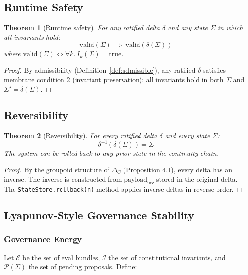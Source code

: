 \documentclass[11pt]{article}
\newtheorem{theorem}{Theorem}[section]
\begin{document}
\subsection{Runtime Safety}

\begin{theorem}[Runtime safety]
\label{thm:safety}
For any ratified delta $\delta$ and any state $\Sigma$ in which
all invariants hold:
\[
  \mathrm{valid}(\Sigma) \;\Longrightarrow\; \mathrm{valid}(\delta(\Sigma))
\]
where $\mathrm{valid}(\Sigma) \Leftrightarrow \forall k.\; I_k(\Sigma) = \mathrm{true}$.
\end{theorem}

\begin{proof}
By admissibility (Definition~\ref{def:admissible}), any ratified
$\delta$ satisfies membrane condition 2 (invariant preservation):
all invariants hold in both $\Sigma$ and $\Sigma' = \delta(\Sigma)$.
\end{proof}

\subsection{Reversibility}

\begin{theorem}[Reversibility]
\label{thm:reversibility}
For every ratified delta $\delta$ and every state $\Sigma$:
\[
  \delta^{-1}(\delta(\Sigma)) = \Sigma
\]
The system can be rolled back to any prior state in the
continuity chain.
\end{theorem}

\begin{proof}
By the groupoid structure of $\Delta_C$ (Proposition 4.1), every
delta has an inverse. The inverse is constructed from
$\mathrm{payload}_{\mathrm{inv}}$ stored in the original delta.
The \texttt{StateStore.rollback(n)} method applies inverse deltas
in reverse order.
\end{proof}

\subsection{Lyapunov-Style Governance Stability}

\subsubsection{Governance Energy}

Let $\mathcal{E}$ be the set of eval bundles, $\mathcal{I}$ the
set of constitutional invariants, and $\mathcal{P}(\Sigma)$ the
set of pending proposals. Define:
\end{document}
